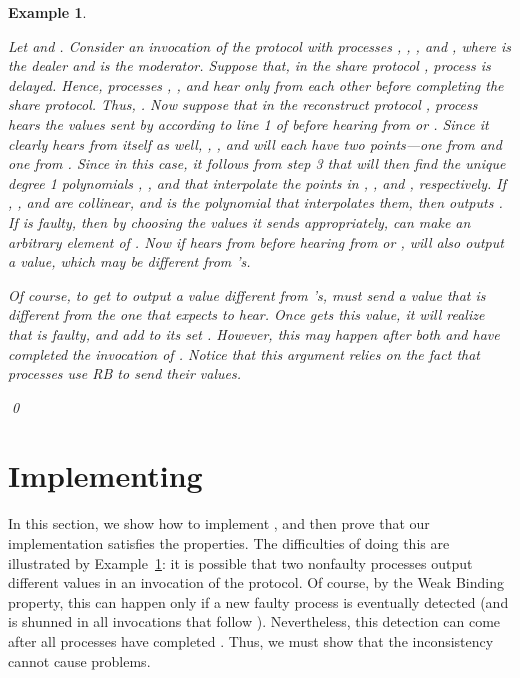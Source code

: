 \documentclass{sig-alternate}
\newtheorem{example}{Example}
\newcommand{\mwdavss}{\text{MW-SVSS}\xspace}
\newcommand{\davss}{{\text{SVSS}}\xspace}
\begin{document}
\begin{example}\label{xam:shunning}
{\rm Let  and . Consider an invocation of the \mwdavss protocol with
processes , , , and , where  is the dealer and  is the
moderator. Suppose that, in the share protocol
, process  is delayed.
Hence, processes , , and  hear only from each other before
completing the  share protocol.
Thus, .
Now suppose that in
the reconstruct protocol , process  hears the values
sent by  according to line 1 of  before hearing from
 or .  Since it clearly hears from itself as well, ,
, and  will each have two points---one from  and
one from .  Since  in this case, it follows from step 3 that
 will then find the unique degree 1 polynomials
, , and  that
interpolate the points in , , and , respectively.
If , , and  are collinear, and
 is the polynomial that interpolates them, then  outputs
.  If  is faulty, then by choosing
the values it sends appropriately,  can make  an
arbitrary element of .  Now if  hears from  before
hearing from  or ,
 will also output a value, which may be different from 's.

Of course, to get  to output a value different from 's,
 must send a value  that is different from the one that
 expects to
hear.  Once  gets this value, it will realize that  is
faulty, and add  to its set .  However, this may happen after
both  and  have completed the invocation of \mwdavss.
Notice that this argument relies on the fact that processes use RB
to send their values.  } \qed
\end{example}












\section{Implementing \davss}\label{sec:FD-AVSS}
In this section, we show how to implement \davss, and then prove that our
implementation satisfies the \davss properties.
The difficulties of doing this are illustrated by Example~\ref{xam:shunning}:
it is possible that two nonfaulty processes output different values in
an invocation  of the
\mwdavss protocol. Of course, by the Weak Binding property, this can
happen only if a new faulty process is eventually detected (and is
shunned in all invocations that follow ).
Nevertheless, this detection can come after all processes have
completed .  Thus, we must show that the inconsistency cannot
cause problems.
\end{document}
